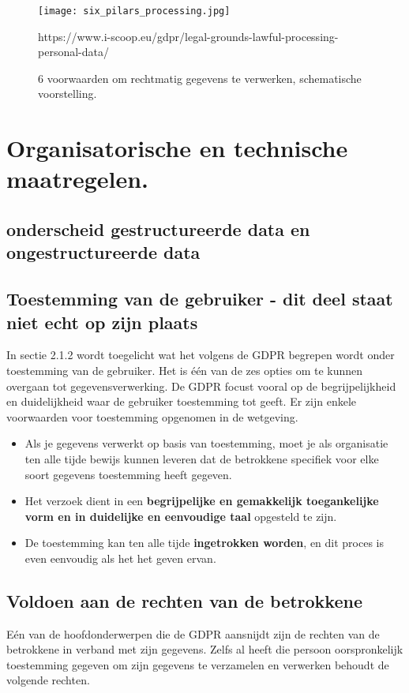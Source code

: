 \begin{figure}[h]
    \centering
    \texttt{[image: six\_pilars\_processing.jpg]}
    \caption{6 voorwaarden om rechtmatig gegevens te verwerken, schematische voorstelling.}
    https://www.i-scoop.eu/gdpr/legal-grounds-lawful-processing-personal-data/
\end{figure}


\section{Organisatorische en technische maatregelen.}
\subsection{onderscheid gestructureerde data en ongestructureerde data}




\subsection{Toestemming van de gebruiker - dit deel staat niet echt op zijn plaats}
In sectie 2.1.2 wordt toegelicht wat het volgens de GDPR begrepen wordt onder toestemming van de gebruiker. Het is één van de zes opties om te kunnen overgaan tot gegevensverwerking. De GDPR focust vooral op de begrijpelijkheid en duidelijkheid waar de gebruiker toestemming tot geeft. Er zijn enkele voorwaarden voor toestemming opgenomen in de wetgeving. 
\begin{itemize}
    \item  Als je gegevens verwerkt op basis van toestemming, moet je als organisatie ten alle tijde bewijs kunnen leveren dat de betrokkene specifiek voor elke soort gegevens toestemming heeft gegeven. 
    \item  Het verzoek dient in een \textbf{begrijpelijke en gemakkelijk toegankelijke vorm en in duidelijke en eenvoudige taal} opgesteld te zijn. 
    \item  
    De toestemming kan ten alle tijde \textbf{ingetrokken worden}, en dit proces is even eenvoudig als het het geven ervan. 
\end{itemize}




\subsection{Voldoen aan de rechten van de betrokkene}

Eén van de hoofdonderwerpen die de GDPR aansnijdt zijn de rechten van de betrokkene in verband met zijn gegevens. Zelfs al heeft die persoon oorspronkelijk toestemming gegeven om zijn gegevens te verzamelen en verwerken behoudt de volgende rechten.


